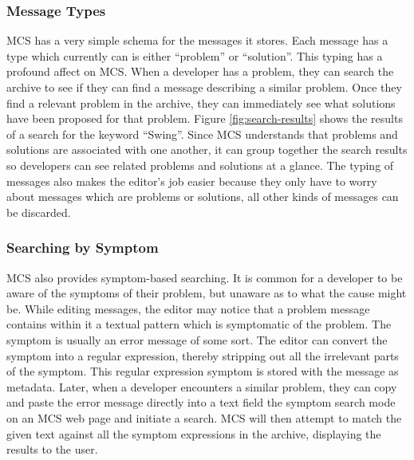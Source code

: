 \begin{figure*}[htbp]
  {\centerline{}}
  \caption{A 2D search of Java Concepts vs. jCVS Versions}
  \label{fig:2d-search}
\end{figure*}

\subsubsection{Message Types}
MCS has a very simple schema for the messages it stores. Each message has a
type which currently can is either ``problem'' or ``solution''. This typing has
a profound affect on MCS. When a developer has a problem, they can search the
archive to see if they can find a message describing a similar problem. Once
they find a relevant problem in the archive, they can immediately see what
solutions have been proposed for that problem. Figure \ref{fig:search-results}
shows the results of a search for the keyword ``Swing''. Since MCS understands
that problems and solutions are associated with one another, it can group
together the search results so developers can see related problems and
solutions at a glance. The typing of messages also makes the editor's job
easier because they only have to worry about messages which are problems or
solutions, all other kinds of messages can be discarded.

\begin{figure*}[htbp]
  {\centerline{}}
  \caption{Results from a search for keyword ``Swing''}
  \label{fig:search-results}
\end{figure*}

\subsubsection{Searching by Symptom}
MCS also provides symptom-based searching. It is common for a developer to be
aware of the symptoms of their problem, but unaware as to what the cause might
be. While editing messages, the editor may notice that a problem message
contains within it a textual pattern which is symptomatic of the problem. The
symptom is usually an error message of some sort. The editor can convert the
symptom into a regular expression, thereby stripping out all the irrelevant
parts of the symptom. This regular expression symptom is stored with the
message as metadata. Later, when a developer encounters a similar problem, they
can copy and paste the error message directly into a text field the symptom
search mode on an MCS web page and initiate a search. MCS will then attempt to
match the given text against all the symptom expressions in the archive,
displaying the results to the user.

